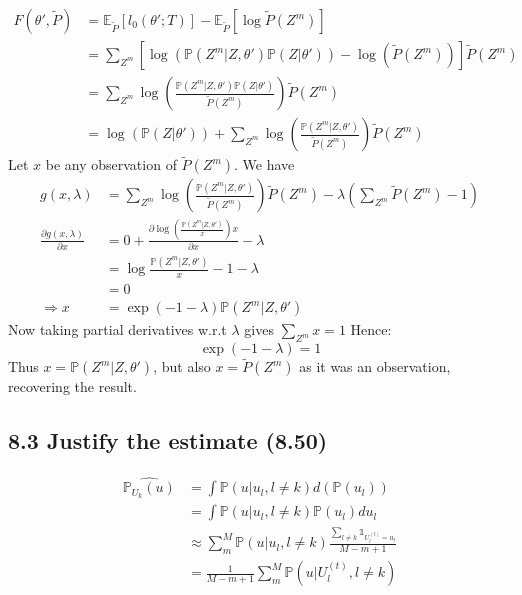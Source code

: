 \begin{align*}
    F(\theta', \tilde{P}) &= \mathbb{E}_{\tilde{P}}\left[l_0 \left(\theta'; T\right)\right] - \mathbb{E}_{\tilde{P}}\left[\log \tilde{P}(Z^m) \right] \\
    &= \sum_{Z^m} \left[\log\left(\mathbb{P}(Z^m \vert Z, \theta') \mathbb{P}(Z\vert \theta')\right) - \log\left(\tilde{P}(Z^m)\right)\right] \tilde{P}(Z^m) \\
    &= \sum_{Z^m} \log\left(\frac{\mathbb{P}(Z^m \vert Z, \theta') \mathbb{P}(Z\vert \theta')}{\tilde{P}(Z^m)}\right)  \tilde{P}(Z^m)  \\
    &= \log\left(\mathbb{P}(Z\vert \theta')\right) + \sum_{Z^m} \log\left(\frac{\mathbb{P}(Z^m \vert Z, \theta') }{\tilde{P}(Z^m)}\right)  \tilde{P}(Z^m) 
\end{align*}
Let $x$ be any observation of $\tilde{P}(Z^m)$. We have
\begin{align*}
    g(x, \lambda) &=  \sum_{Z^m} \log\left(\frac{\mathbb{P}(Z^m \vert Z, \theta') }{\tilde{P}(Z^m)}\right) \tilde{P}(Z^m)  - \lambda \left(\sum_{Z^m} \tilde{P}(Z^m) - 1\right)\\
    \frac{\partial g(x, \lambda)}{\partial x} &= 0 + \frac{ \partial \log\left(\frac{\mathbb{P}(Z^m \vert Z, \theta') }{x} \right) x}{\partial x} - \lambda\\
     &= \log \frac{\mathbb{P}(Z^m \vert Z, \theta') }{x} -1 - \lambda\\
     &= 0 \\
    \Rightarrow x &= \exp\left(-1-\lambda\right)\mathbb{P}(Z^m \vert Z, \theta') 
\end{align*}
Now taking partial derivatives w.r.t $\lambda$ gives $\sum_{Z^m} x = 1$
Hence:
$$\exp\left(-1-\lambda\right) = 1$$
Thus $x = \mathbb{P}(Z^m \vert Z, \theta')$, but also $x = \tilde{P}(Z^m)$ as it was an observation, recovering the result.

\subsection*{8.3 Justify the estimate (8.50)}
\begin{align*}
\widehat{\mathbb{P}_{U_k}(u)} &= \int \mathbb{P}(u\vert u_l, l\neq k) d(\mathbb{P}(u_l)) \\
&= \int \mathbb{P}(u\vert u_l, l\neq k)\mathbb{P}(u_l) du_l \\
&\approx \sum_m^M \mathbb{P}(u\vert u_l, l\neq k) \frac{\sum_{l\neq k} \mathbb{1}_{U_l^{(t)} = u_l}}{M - m + 1} \\
&= \frac{1}{M - m + 1} \sum_m^M \mathbb{P}(u \vert U_l^{(t)}, l\neq k) 
\end{align*}

